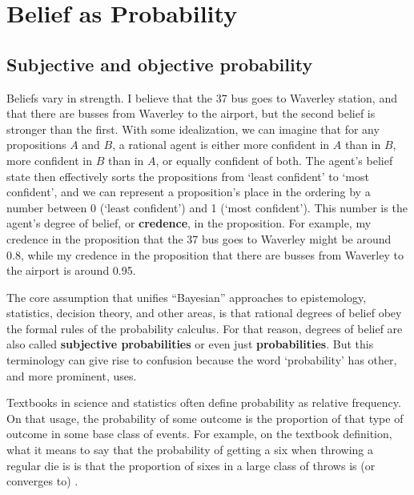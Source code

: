 \chapter{Belief as Probability}\label{ch:probability}




\section{Subjective and objective probability}

Beliefs vary in strength. I believe that the 37 bus goes to Waverley
station, and that there are busses from Waverley to the airport, but
the second belief is stronger than the first. With some idealization,
we can imagine that for any propositions $A$ and $B$, a rational agent
is either more confident in $A$ than in $B$, more confident in $B$
than in $A$, or equally confident of both. The agent's belief state
then effectively sorts the propositions from `least confident' to
`most confident', and we can represent a proposition's place in the
ordering by a number between 0 (`least confident') and 1 (`most
confident'). This number is the agent's degree of belief, or
\textbf{credence}, in the proposition. For example, my credence in the
proposition that the 37 bus goes to Waverley might be around 0.8,
while my credence in the proposition that there are busses from
Waverley to the airport is around 0.95.

The core assumption that unifies ``Bayesian'' approaches to
epistemology, statistics, decision theory, and other areas, is that
rational degrees of belief obey the formal rules of the probability
calculus. For that reason, degrees of belief are also called
\textbf{subjective probabilities} or even just \textbf{probabilities}.
But this terminology can give rise to confusion because the word
`probability' has other, and more prominent, uses.

Textbooks in science and statistics often define probability as
relative frequency. On that usage, the probability of some outcome is
the proportion of that type of outcome in some base class of events.
For example, on the textbook definition, what it means to say that the
probability of getting a six when throwing a regular die is
 is that the proportion of sixes in a large class of
throws is (or converges to) .

